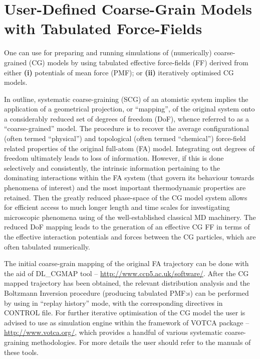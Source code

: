 \section{User-Defined Coarse-Grain Models with Tabulated Force-Fields}
\label{cg-intro}

One can use \D for preparing and running simulations of (numerically)
coarse-grained (CG) models by using tabulated effective force-fields
(FF) derived from either {\bf (i)} potentials of mean force (PMF);
or {\bf (ii)} iteratively optimised CG models.

In outline, systematic coarse-graining (SCG) of an atomistic system
implies the application of a geometrical projection, or ``mapping'',
of the original system onto a considerably reduced set of degrees of freedom (DoF),
whence referred to as a ``coarse-grained'' model.  The procedure is to recover
the average configurational (often termed ``physical'') and topological
(often termed ``chemical'') force-field related properties of the original
full-atom (FA) model.  Integrating out degrees of freedom ultimately
leads to loss of information.  However, if this is done selectively and
consistently, the intrinsic information pertaining to the dominating
interactions within the FA system (that govern its behaviour towards
phenomena of interest) and the most important thermodynamic properties
are retained.  Then the greatly reduced phase-space of the CG model system
allows for efficient access to much longer length and time scales for
investigating microscopic phenomena using of the well-established
classical MD machinery.  The reduced DoF mapping leads to the generation
of an effective CG FF in terms of the effective interaction potentials
and forces between the CG particles, which are often tabulated numerically.

The initial coarse-grain mapping of the original FA trajectory can be done
with the aid of DL\_CGMAP tool -- \href{http://www.ccp5.ac.uk/software/}
{http://www.ccp5.ac.uk/software/}. After the CG mapped trajectory
has been obtained, the relevant distribution analysis and the Boltzmann
Inversion procedure (producing tabulated PMF:s) can be performed by using \D
in ``replay history'' mode, with the corresponding directives in CONTROL file.
For further iterative optimisation of the CG model the user is advised
to use \D as simulation engine within the framework of VOTCA package --
\href{http://www.votca.org/}{http://www.votca.org/}, which
provides a handful of various systematic coarse-graining methodologies.
For more details the user should refer to the manuals of these tools.

